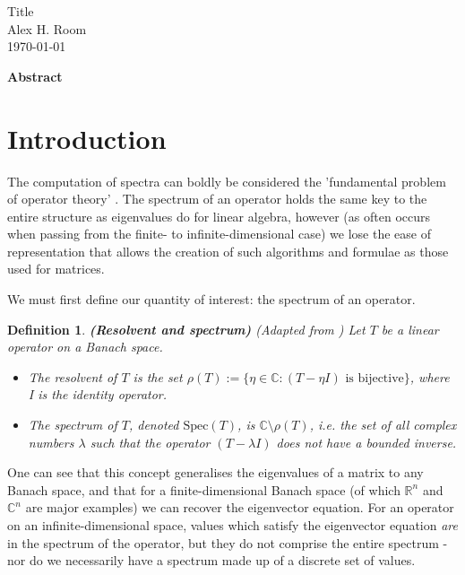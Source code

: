 \documentclass{article}
\newtheorem*{definition}{Definition}
\newcommand{\Spec}{\text{Spec}} %
\newcommand{\1}{\mathbf{1}} %
\begin{document}
  \begin{titlepage}
    \vspace*{\fill}
    \begin{center}
      {\Huge Title}\\[0.5cm]
      {\Large Alex H. Room}\\[0.4cm]
      {\Large \today}
    \end{center}
     \vspace{\fill}
     {\normalsize\textbf{Abstract} {\blindtext}}
     \vspace*{\fill}
  \end{titlepage}
\tableofcontents


\section{Introduction}
The computation of spectra can boldly be considered the 'fundamental problem of operator theory' \parencite{arveson2002short}. The spectrum
of an operator holds the same key to the entire structure as eigenvalues do for linear algebra, however (as often occurs when passing from 
the finite- to infinite-dimensional case) we lose the ease of representation that allows the creation of such algorithms and formulae as those 
used for matrices. 

We must first define our quantity of interest: the spectrum of an operator.
\begin{definition}{\textbf{(Resolvent and spectrum)}}
(Adapted from \parencite{evans2010partial}) Let $T$ be a linear operator on a Banach space.
\begin{itemize}
\item The resolvent of $T$ is the set $\rho(T) := \{\eta \in \mathbb{C} : (T - \eta I)\text{ is bijective}\}$, where I is the identity operator. 
\item The spectrum of $T$, denoted $\Spec(T)$, is $\mathbb{C} \setminus \rho(T)$, i.e. the set of all complex numbers $\lambda$ such 
that the operator $(T - \lambda I)$ does not have a bounded inverse.
\end{itemize}
\end{definition}

One can see that this concept generalises the eigenvalues of a matrix to any Banach space, and that for a finite-dimensional Banach space
(of which $\mathbb{R}^n$ and $\mathbb{C}^n$ are major examples) we can recover the eigenvector equation. For an operator on an
infinite-dimensional space, values which satisfy the eigenvector equation \emph{are} in the spectrum of the operator, but they do not
comprise the entire spectrum - nor do we necessarily have a spectrum made up of a discrete set of values.
\end{document}
